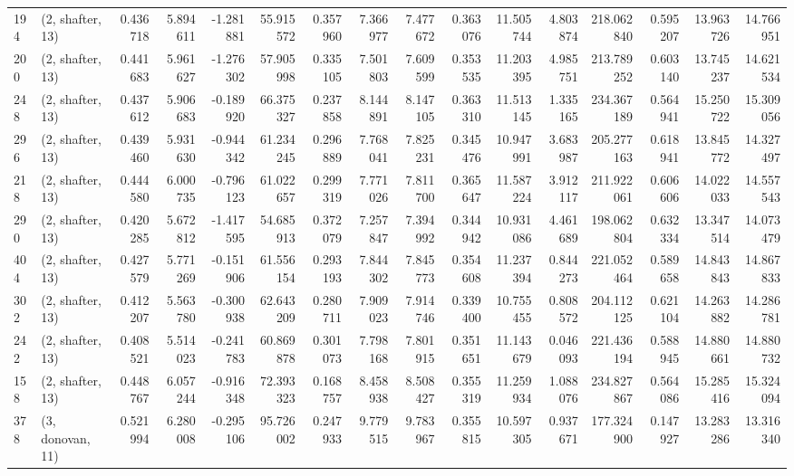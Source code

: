 \begin{tabular}{llrrrrrrrrrrrrrr}
194 &  (2, shafter, 13) &   0.436718 &   5.894611 &  -1.281881 &    55.915572 &   0.357960 &   7.366977 &   7.477672 &  0.363076 &  11.505744 &   4.803874 &   218.062840 &   0.595207 &  13.963726 &  14.766951 \\
200 &  (2, shafter, 13) &   0.441683 &   5.961627 &  -1.276302 &    57.905998 &   0.335105 &   7.501803 &   7.609599 &  0.353535 &  11.203395 &   4.985751 &   213.789252 &   0.603140 &  13.745237 &  14.621534 \\
248 &  (2, shafter, 13) &   0.437612 &   5.906683 &  -0.189920 &    66.375327 &   0.237858 &   8.144891 &   8.147105 &  0.363310 &  11.513145 &   1.335165 &   234.367189 &   0.564941 &  15.250722 &  15.309056 \\
296 &  (2, shafter, 13) &   0.439460 &   5.931630 &  -0.944342 &    61.234245 &   0.296889 &   7.768041 &   7.825231 &  0.345476 &  10.947991 &   3.683987 &   205.277163 &   0.618941 &  13.845772 &  14.327497 \\
218 &  (2, shafter, 13) &   0.444580 &   6.000735 &  -0.796123 &    61.022657 &   0.299319 &   7.771026 &   7.811700 &  0.365647 &  11.587224 &   3.912117 &   211.922061 &   0.606606 &  14.022033 &  14.557543 \\
290 &  (2, shafter, 13) &   0.420285 &   5.672812 &  -1.417595 &    54.685913 &   0.372079 &   7.257847 &   7.394992 &  0.344942 &  10.931086 &   4.461689 &   198.062804 &   0.632334 &  13.347514 &  14.073479 \\
404 &  (2, shafter, 13) &   0.427579 &   5.771269 &  -0.151906 &    61.556154 &   0.293193 &   7.844302 &   7.845773 &  0.354608 &  11.237394 &   0.844273 &   221.052464 &   0.589658 &  14.843843 &  14.867833 \\
302 &  (2, shafter, 13) &   0.412207 &   5.563780 &  -0.300938 &    62.643209 &   0.280711 &   7.909023 &   7.914746 &  0.339400 &  10.755455 &   0.808572 &   204.112125 &   0.621104 &  14.263882 &  14.286781 \\
242 &  (2, shafter, 13) &   0.408521 &   5.514023 &  -0.241783 &    60.869878 &   0.301073 &   7.798168 &   7.801915 &  0.351651 &  11.143679 &   0.046093 &   221.436194 &   0.588945 &  14.880661 &  14.880732 \\
158 &  (2, shafter, 13) &   0.448767 &   6.057244 &  -0.916348 &    72.393323 &   0.168757 &   8.458938 &   8.508427 &  0.355319 &  11.259934 &   1.088076 &   234.827867 &   0.564086 &  15.285416 &  15.324094 \\
378 &  (3, donovan, 11) &   0.521994 &   6.280008 &  -0.295106 &    95.726002 &   0.247933 &   9.779515 &   9.783967 &  0.355815 &  10.597305 &   0.937671 &   177.324900 &   0.147927 &  13.283286 &  13.316340 \\

\end{tabular}
